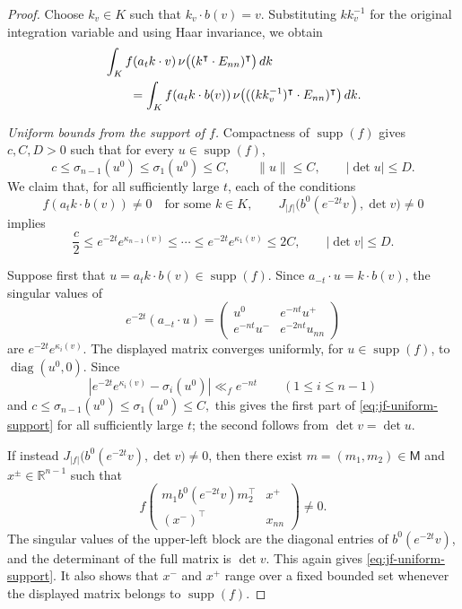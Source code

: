 \documentclass[reqno,11pt]{amsart}
\numberwithin{equation}{section}
\theoremstyle{definition}
\theoremstyle{remark}
\begin{document}
\begin{proof}
Choose $k_v\in K$ such that $k_v\cdot b(v)=v$.
Substituting $kk_v^{-1}$ for the original integration variable and
using Haar invariance, we obtain
\begin{align}
&\int_K f(a_tk\cdot v)\,
\nu\bigl((k^{\intercal}\cdot E_{nn})^{\intercal}\bigr)\,dk \notag\\
&\qquad=
\int_K f(a_tk\cdot b(v))\,
\nu\bigl(((kk_v^{-1})^{\intercal}\cdot E_{nn})^{\intercal}\bigr)\,dk.
\label{eq:jf-reduced-integral}
\end{align}

\smallskip
\noindent\emph{Uniform bounds from the support of $f$.}
Compactness of $\operatorname{supp}(f)$ gives $c,C,D>0$ such that for every $u\in\operatorname{supp}(f)$,
$$
c\le \sigma_{n-1}(u^0)\le \sigma_1(u^0)\le C,
\qquad
\|u\|\le C,
\qquad
|\det u|\le D.
$$
 We claim that, for all
sufficiently large $t$, each of the conditions
$$
f(a_tk\cdot b(v))\ne0\quad\text{for some }k\in K,
\qquad
J_{|f|}\bigl(b^0(e^{-2t}v),\det v\bigr)\ne0
$$
implies
\begin{equation}\label{eq:jf-uniform-support}
\frac c2\le e^{-2t}e^{\kappa_{n-1}(v)}
\le\cdots\le e^{-2t}e^{\kappa_1(v)}\le 2C,
\qquad
|\det v|\le D.
\end{equation}

Suppose first that $u=a_tk\cdot b(v)\in\operatorname{supp}(f)$. Since
$a_{-t}\cdot u=k\cdot b(v)$, the singular values of
$$
e^{-2t}(a_{-t}\cdot u)
=
\begin{pmatrix}
u^0&e^{-nt}u^+\\
e^{-nt}u^-&e^{-2nt}u_{nn}
\end{pmatrix}
$$
are $e^{-2t}e^{\kappa_i(v)}$. The displayed matrix converges uniformly,
for $u\in\operatorname{supp}(f)$, to $\operatorname{diag}(u^0,0)$.
Since
$$
\left|e^{-2t}e^{\kappa_i(v)}-\sigma_i(u^0)\right|
\ll_f e^{-nt}
\qquad(1\le i\le n-1)
$$
and
$
c\le\sigma_{n-1}(u^0)\le\sigma_1(u^0)\le C,
$
this gives the first part of \eqref{eq:jf-uniform-support} for all
sufficiently large $t$; the second follows from $\det v=\det u$.

If instead
$J_{|f|}\bigl(b^0(e^{-2t}v),\det v\bigr)\ne0$, then there exist
$m=(m_1,m_2)\in\mathsf M$ and $x^\pm\in\mathbb R^{n-1}$ such that
$$
f\!\begin{pmatrix}
m_1b^0(e^{-2t}v)m_2^{\intercal}&x^+\\
(x^-)^{\intercal}&x_{nn}
\end{pmatrix}
\ne0.
$$
The singular values of the upper-left block are the diagonal entries of
$b^0(e^{-2t}v)$, and the determinant of the full matrix is $\det v$.
This again gives \eqref{eq:jf-uniform-support}. It also shows that
$x^-$ and $x^+$ range over a fixed bounded set whenever the displayed
matrix belongs to $\operatorname{supp}(f)$.


\end{proof}
\end{document}
